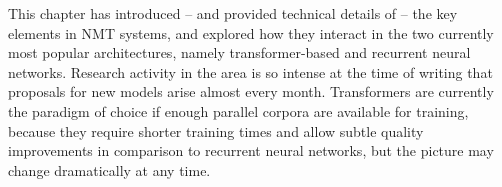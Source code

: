 \documentclass[output=paper,colorlinks,citecolor=brown]{langscibook}
\begin{document}
This chapter has introduced -- and provided technical details of -- the key elements in NMT systems, and explored how they interact in the two currently most popular architectures, namely transformer-based and recurrent neural networks. Research activity in the area is so intense at the time of writing that proposals for new models arise almost every month. Transformers are currently the paradigm of choice if enough parallel corpora are available for training, because they require shorter training times and allow subtle quality improvements in comparison to recurrent neural networks, but the picture may change dramatically at any time. 



\sloppy
\printbibliography[heading=subbibliography,notkeyword=this]
\end{document}

